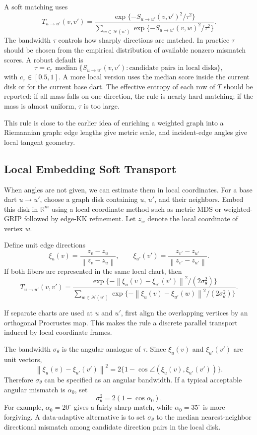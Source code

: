 \documentclass[11pt]{article}
\newcommand{\R}{\mathbb R}
\newcommand{\N}{\mathcal N}
\newcommand{\norm}[1]{\left\lVert #1 \right\rVert}
\begin{document}
A soft matching uses
\[
  T_{u\to u'}(v,v')
  =
  \frac{\exp\{-S_{u\to u'}(v,v')^2/\tau^2\}}
       {\sum_{w\in\N(u')}\exp\{-S_{u\to u'}(v,w)^2/\tau^2\}}.
\]
The bandwidth \(\tau\) controls how sharply directions are matched.  In
practice \(\tau\) should be chosen from the empirical distribution of available
nonzero mismatch scores.  A robust default is
\[
  \tau
  =
  c_\tau\,
  \operatorname{median}
  \{S_{u\to u'}(v,v'):\text{candidate pairs in local disks}\},
\]
with \(c_\tau\in[0.5,1]\).  A more local version uses the median score inside
the current disk or for the current base dart.  The effective entropy of each
row of \(T\) should be reported: if all mass falls on one direction, the rule
is nearly hard matching; if the mass is almost uniform, \(\tau\) is too large.

This rule is close to the earlier idea of enriching a weighted graph into a
Riemannian graph: edge lengths give metric scale, and incident-edge angles give
local tangent geometry.

\subsection{Local Embedding Soft Transport}

When angles are not given, we can estimate them in local coordinates.  For a
base dart \(u\to u'\), choose a graph disk containing \(u\), \(u'\), and their
neighbors.  Embed this disk in \(\R^m\) using a local coordinate method such as
metric MDS or weighted-GRIP followed by edge-KK refinement.  Let \(z_w\) denote
the local coordinate of vertex \(w\).

Define unit edge directions
\[
  \xi_u(v)=
  \frac{z_v-z_u}{\norm{z_v-z_u}},
  \qquad
  \xi_{u'}(v')=
  \frac{z_{v'}-z_{u'}}{\norm{z_{v'}-z_{u'}}}.
\]
If both fibers are represented in the same local chart, then
\[
  T_{u\to u'}(v,v')
  =
  \frac{
  \exp\{-\norm{\xi_u(v)-\xi_{u'}(v')}^2/(2\sigma_\theta^2)\}
  }
  {
  \sum_{w\in\N(u')}
  \exp\{-\norm{\xi_u(v)-\xi_{u'}(w)}^2/(2\sigma_\theta^2)\}
  }.
\]

If separate charts are used at \(u\) and \(u'\), first align the overlapping
vertices by an orthogonal Procrustes map.  This makes the rule a discrete
parallel transport induced by local coordinate frames.

The bandwidth \(\sigma_\theta\) is the angular analogue of \(\tau\).  Since
\(\xi_u(v)\) and \(\xi_{u'}(v')\) are unit vectors,
\[
  \norm{\xi_u(v)-\xi_{u'}(v')}^2
  =
  2\{1-\cos\angle(\xi_u(v),\xi_{u'}(v'))\}.
\]
Therefore \(\sigma_\theta\) can be specified as an angular bandwidth.  If a
typical acceptable angular mismatch is \(\alpha_0\), set
\[
  \sigma_\theta^2 = 2(1-\cos\alpha_0).
\]
For example, \(\alpha_0=20^\circ\) gives a fairly sharp match, while
\(\alpha_0=35^\circ\) is more forgiving.  A data-adaptive alternative is to set
\(\sigma_\theta\) to the median nearest-neighbor directional mismatch among
candidate direction pairs in the local disk.
\end{document}
